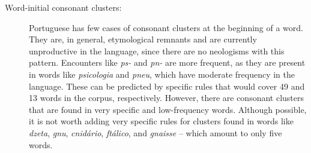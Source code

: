 \begin{description}
    \item[Word-initial consonant clusters:\label{word-init-cc}] Portuguese has few cases of
	consonant clusters at the beginning of a word. They are, in general, 
	etymological remnants and are currently unproductive in the language,
	since there are no neologisms with this pattern. Encounters like
	\emph{ps-} and \emph{pn-} are more frequent, as they are present in
	words like \emph{psicologia} and \emph{pneu}, which have moderate 
	frequency in the language. These can be predicted by specific rules that would cover  
	49 and 13 words in the corpus, respectively.
	However, there are consonant clusters that are
	found in very specific and low-frequency words. Although possible, it
	is not worth adding very specific rules for clusters found in words like
	\emph{dzeta}, \emph{gnu}, \emph{cnidário},
	\emph{ftálico}, and \emph{gnaisse} -- which amount to only five words.


\end{description}
